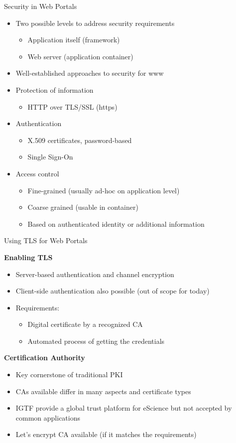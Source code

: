 \documentclass[smaller,t]{beamer}
\def\nadpis#1{\par\medskip\textbf{#1}}
\begin{document}
\begin{frame}{Security in Web Portals}
\begin{itemize}
\item Two possible levels to address security requirements
\begin{itemize}
\item Application itself (framework)
\item Web server (application container)
\end{itemize}
\item Well-established approaches to security for www
\item Protection of information 
\begin{itemize}
\item HTTP over TLS/SSL (https)
\end{itemize}
\item Authentication
\begin{itemize}
\item X.509 certificates, password-based
\item Single Sign-On
\end{itemize}
\item Access control
\begin{itemize}
\item Fine-grained (usually ad-hoc on application level)
\item Coarse grained (usable in container)
\item Based on authenticated identity or additional information
\end{itemize}
\end{itemize}
\end{frame}


\begin{frame}{Using TLS for Web Portals}
\nadpis{Enabling TLS}
\begin{itemize}
\item Server-based authentication and channel encryption
\item Client-side authentication also possible (out of scope for today)
\item Requirements:
\begin{itemize}
\item Digital certificate by a recognized CA
\item Automated process of getting the credentials
\end{itemize}
\end{itemize}

\nadpis{Certification Authority}
\begin{itemize}
\item Key cornerstone of traditional PKI
\item CAs available differ in many aspects and certificate types
\item IGTF provide a global trust platform for eScience but not accepted by
common applications
\item Let's encrypt CA available (if it matches the requirements)
\end{itemize}
\end{frame}
\end{document}
